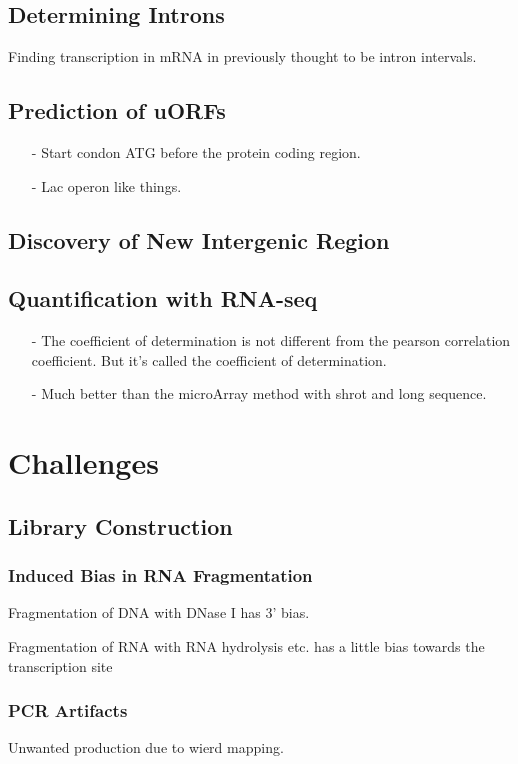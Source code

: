 \documentclass[12pt]{article}
\begin{document}
{	\subsection{Determining Introns}
	Finding transcription in mRNA in previously thought to be intron intervals.
	
	\subsection{Prediction of uORFs}
	\begin{itemize}
		\item [-]Start condon ATG before the protein coding region.
		\item [-]Lac operon like things.
	\end{itemize}
	
	\subsection{Discovery of New Intergenic Region}
	
	\subsection{Quantification with RNA-seq}
	\begin{itemize}
		\item [-]The coefficient of determination is not different from the pearson correlation coefficient. But it's called the coefficient of determination.
		\item [-]Much better than the microArray method with shrot and long sequence.
	\end{itemize}
	
	\section{Challenges}
	\subsection{Library Construction}
	\subsubsection{Induced Bias in RNA Fragmentation}
	Fragmentation of DNA with DNase I has 3' bias.
	
	Fragmentation of RNA with RNA hydrolysis etc. has a little bias towards the transcription site
	\subsubsection{PCR Artifacts}
	Unwanted production due to wierd mapping.
}
\end{document}
